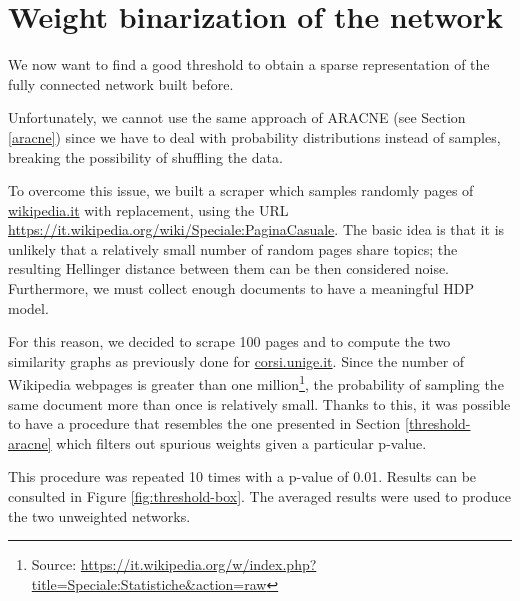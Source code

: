 \section{Weight binarization of the network}
We now want to find a good threshold to obtain a sparse representation of the fully connected network built before.

Unfortunately, we cannot use the same approach of ARACNE (see Section \ref{aracne}) 
since we have to deal with probability distributions instead of samples, breaking the 
possibility of shuffling the data. 

To overcome this issue, we built a scraper which samples randomly pages of \url{wikipedia.it} with replacement,
using the URL \url{https://it.wikipedia.org/wiki/Speciale:PaginaCasuale}.
The basic idea is that it is unlikely that a relatively small number of random pages share topics; 
the resulting Hellinger distance between them can be then considered noise. 
Furthermore, we must collect enough documents to have a meaningful HDP model.

For this reason, we decided to scrape 100 pages and to compute the two similarity graphs as previously done for \url{corsi.unige.it}. 
Since the number of Wikipedia webpages is greater than one million\footnote{Source: \url{https://it.wikipedia.org/w/index.php?title=Speciale:Statistiche\&action=raw}},
the probability of sampling the same document more than once is relatively small. 
Thanks to this, it was possible 
to have a procedure that resembles the one presented in Section \ref{threshold-aracne} 
which filters out spurious weights given a particular p-value.

This procedure was repeated 10 times with a p-value of 0.01. Results can be consulted in Figure \ref{fig:threshold-box}.
The averaged results were used to produce the two unweighted networks.


